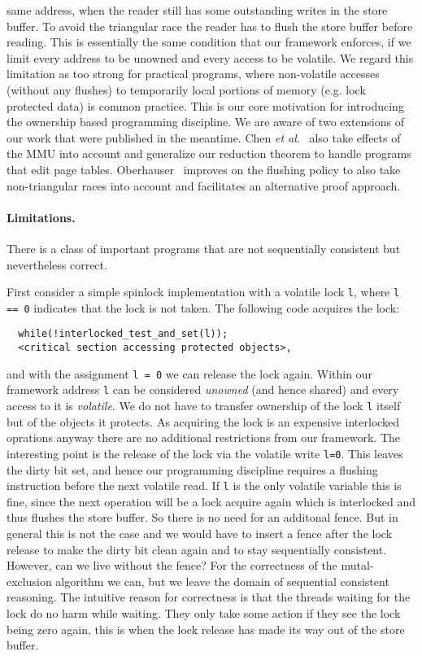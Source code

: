 \documentclass[11pt]{llncs}
\begin{document}
same address, when the reader still has some outstanding writes in the store buffer.
To avoid the triangular race the reader has to flush the store buffer before reading.
This is essentially the same condition that our framework enforces, if we limit 
 every address to be unowned and every access to be volatile. 
We regard this limitation as too strong for practical programs, where non-volatile accesses
(without any flushes) to temporarily local portions of memory (e.g. lock protected data) is common practice. 
This is our core motivation for introducing the ownership based programming discipline.
%
We are aware of two extensions of our work that were published in the meantime.
Chen \textit{et al}.~\cite{chen-2014} also take effects of the MMU into account and generalize our reduction theorem to handle programs that edit page tables.
Oberhauser~\cite{Oberhauser-2016} improves on the flushing policy to also take non-triangular races into account and facilitates an alternative proof approach.


\paragraph{Limitations.}
There is a class of important programs that are not sequentially consistent but nevertheless correct.

First consider a simple spinlock implementation with a volatile lock \texttt{l}, where \texttt{l == 0} 
indicates that the lock is not taken. The following code acquires the lock:
\begin{verbatim}
  while(!interlocked_test_and_set(l));
  <critical section accessing protected objects>,
\end{verbatim}
and with the assignment \texttt{l = 0} we can release the lock again. 
Within our framework address \texttt{l} can be considered \emph{unowned} (and hence shared) and every access to it  
is \emph{volatile}.
We do not have to transfer ownership of the lock \texttt{l} itself but of the objects it protects.
As acquiring the lock is an expensive interlocked oprations anyway there are no additional restrictions from our framework. 
The interesting point is the release of the lock via the volatile write \texttt{l=0}. 
This leaves the dirty bit set, and hence our programming discipline requires a flushing instruction before the 
next volatile read. 
If \texttt{l} is the only volatile variable this is fine, since the next operation will be a lock acquire again which is interlocked and thus flushes the store buffer. 
So there is no need for an additonal fence. 
But in general this is not the case and we would have to insert a fence after the lock release to make the dirty bit clean again and to stay sequentially consistent. However, can we live without the fence? For the correctness of the mutal-exclusion algorithm we can, but we leave the domain of sequential consistent reasoning. 
The intuitive reason for correctness is that the threads waiting for the lock do no harm while waiting. They only take some action if they see the lock being zero again, this is when the lock release has made its way out of the store buffer.
\end{document}
